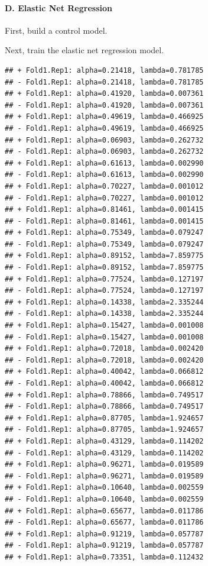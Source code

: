 \documentclass[
]{article}
\begin{document}
\hypertarget{d.-elastic-net-regression}{%
\paragraph{D. Elastic Net Regression}\label{d.-elastic-net-regression}}

First, build a control model.

Next, train the elastic net regression model.

\begin{verbatim}
## + Fold1.Rep1: alpha=0.21418, lambda=0.781785 
## - Fold1.Rep1: alpha=0.21418, lambda=0.781785 
## + Fold1.Rep1: alpha=0.41920, lambda=0.007361 
## - Fold1.Rep1: alpha=0.41920, lambda=0.007361 
## + Fold1.Rep1: alpha=0.49619, lambda=0.466925 
## - Fold1.Rep1: alpha=0.49619, lambda=0.466925 
## + Fold1.Rep1: alpha=0.06903, lambda=0.262732 
## - Fold1.Rep1: alpha=0.06903, lambda=0.262732 
## + Fold1.Rep1: alpha=0.61613, lambda=0.002990 
## - Fold1.Rep1: alpha=0.61613, lambda=0.002990 
## + Fold1.Rep1: alpha=0.70227, lambda=0.001012 
## - Fold1.Rep1: alpha=0.70227, lambda=0.001012 
## + Fold1.Rep1: alpha=0.81461, lambda=0.001415 
## - Fold1.Rep1: alpha=0.81461, lambda=0.001415 
## + Fold1.Rep1: alpha=0.75349, lambda=0.079247 
## - Fold1.Rep1: alpha=0.75349, lambda=0.079247 
## + Fold1.Rep1: alpha=0.89152, lambda=7.859775 
## - Fold1.Rep1: alpha=0.89152, lambda=7.859775 
## + Fold1.Rep1: alpha=0.77524, lambda=0.127197 
## - Fold1.Rep1: alpha=0.77524, lambda=0.127197 
## + Fold1.Rep1: alpha=0.14338, lambda=2.335244 
## - Fold1.Rep1: alpha=0.14338, lambda=2.335244 
## + Fold1.Rep1: alpha=0.15427, lambda=0.001008 
## - Fold1.Rep1: alpha=0.15427, lambda=0.001008 
## + Fold1.Rep1: alpha=0.72018, lambda=0.002420 
## - Fold1.Rep1: alpha=0.72018, lambda=0.002420 
## + Fold1.Rep1: alpha=0.40042, lambda=0.066812 
## - Fold1.Rep1: alpha=0.40042, lambda=0.066812 
## + Fold1.Rep1: alpha=0.78866, lambda=0.749517 
## - Fold1.Rep1: alpha=0.78866, lambda=0.749517 
## + Fold1.Rep1: alpha=0.87705, lambda=1.924657 
## - Fold1.Rep1: alpha=0.87705, lambda=1.924657 
## + Fold1.Rep1: alpha=0.43129, lambda=0.114202 
## - Fold1.Rep1: alpha=0.43129, lambda=0.114202 
## + Fold1.Rep1: alpha=0.96271, lambda=0.019589 
## - Fold1.Rep1: alpha=0.96271, lambda=0.019589 
## + Fold1.Rep1: alpha=0.10640, lambda=0.002559 
## - Fold1.Rep1: alpha=0.10640, lambda=0.002559 
## + Fold1.Rep1: alpha=0.65677, lambda=0.011786 
## - Fold1.Rep1: alpha=0.65677, lambda=0.011786 
## + Fold1.Rep1: alpha=0.91219, lambda=0.057787 
## - Fold1.Rep1: alpha=0.91219, lambda=0.057787 
## + Fold1.Rep1: alpha=0.73351, lambda=0.112432 

\end{verbatim}
\end{document}
